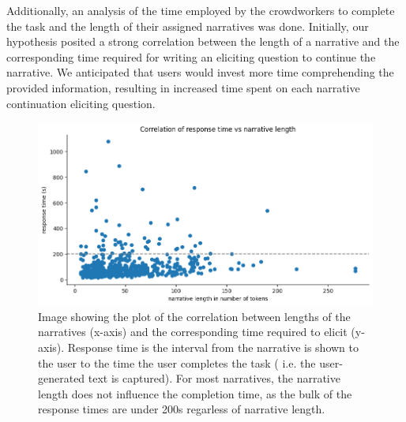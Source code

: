 Additionally, an analysis of the time employed by the crowdworkers to complete the task and the length of their assigned narratives was done. Initially, our hypothesis posited a strong correlation between the length of a narrative and the corresponding time required for writing an eliciting question to continue the narrative. We anticipated that users would invest more time comprehending the provided information, resulting in increased time spent on each narrative continuation eliciting question.
\begin{figure}[!htbp]
    \centering
    \includegraphics[width=1\linewidth]{assets//imgs/dataset-pearson-correlation.png}
    \caption{Image showing the plot of the correlation between lengths of the narratives (x-axis) and the corresponding time required to elicit (y-axis). Response time is the interval from the narrative is shown to the user to the time the user completes the task ( i.e. the user-generated text is captured). For most narratives, the narrative length does not influence the completion time, as the bulk of the response times are under 200s regarless of narrative length. }
    \label{fig:dataset-pearson-correlation}
\end{figure}
